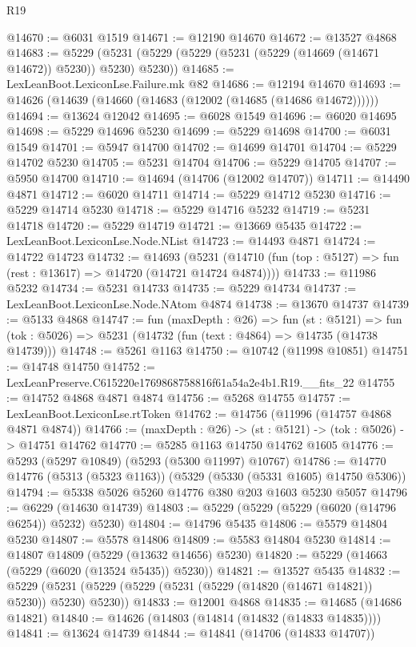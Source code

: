 \begin{lexlean}{R19}
\begin{coremodule}
@14670 := @6031 @1519
@14671 := @12190 @14670
@14672 := @13527 @4868
@14683 := @5229 (@5231 (@5229 (@5229 (@5231 (@5229 (@14669 (@14671 @14672)) @5230)) @5230) @5230))
@14685 := LexLeanBoot.LexiconLse.Failure.mk @82
@14686 := @12194 @14670
@14693 := @14626 (@14639 (@14660 (@14683 (@12002 (@14685 (@14686 @14672))))))
@14694 := @13624 @12042
@14695 := @6028 @1549
@14696 := @6020 @14695
@14698 := @5229 @14696 @5230
@14699 := @5229 @14698
@14700 := @6031 @1549
@14701 := @5947 @14700
@14702 := @14699 @14701
@14704 := @5229 @14702 @5230
@14705 := @5231 @14704
@14706 := @5229 @14705
@14707 := @5950 @14700
@14710 := @14694 (@14706 (@12002 @14707))
@14711 := @14490 @4871
@14712 := @6020 @14711
@14714 := @5229 @14712 @5230
@14716 := @5229 @14714 @5230
@14718 := @5229 @14716 @5232
@14719 := @5231 @14718
@14720 := @5229 @14719
@14721 := @13669 @5435
@14722 := LexLeanBoot.LexiconLse.Node.NList
@14723 := @14493 @4871
@14724 := @14722 @14723
@14732 := @14693
    (@5231 (@14710 (fun (top : @5127) => fun (rest : @13617) => @14720 (@14721 @14724 @4874))))
@14733 := @11986 @5232
@14734 := @5231 @14733
@14735 := @5229 @14734
@14737 := LexLeanBoot.LexiconLse.Node.NAtom @4874
@14738 := @13670 @14737
@14739 := @5133 @4868
@14747 := fun (maxDepth : @26) =>
  fun (st : @5121) =>
  fun (tok : @5026) => @5231 (@14732 (fun (text : @4864) => @14735 (@14738 @14739)))
@14748 := @5261 @1163
@14750 := @10742 (@11998 @10851)
@14751 := @14748 @14750
@14752 := LexLeanPreserve.C615220e1769868758816f61a54a2e4b1.R19.__fits_22
@14755 := @14752 @4868 @4871 @4874
@14756 := @5268 @14755
@14757 := LexLeanBoot.LexiconLse.rtToken
@14762 := @14756 (@11996 (@14757 @4868 @4871 @4874))
@14766 := (maxDepth : @26) -> (st : @5121) -> (tok : @5026) -> @14751 @14762
@14770 := @5285 @1163 @14750 @14762 @1605
@14776 := @5293 (@5297 @10849) (@5293 (@5300 @11997) @10767)
@14786 := @14770 @14776 (@5313 (@5323 @1163)) (@5329 (@5330 (@5331 @1605) @14750 @5306))
@14794 := @5338 @5026 @5260 @14776 @380 @203 @1603 @5230 @5057
@14796 := @6229 (@14630 @14739)
@14803 := @5229 (@5229 (@5229 (@6020 (@14796 @6254)) @5232) @5230)
@14804 := @14796 @5435
@14806 := @5579 @14804 @5230
@14807 := @5578 @14806
@14809 := @5583 @14804 @5230
@14814 := @14807 @14809 (@5229 (@13632 @14656) @5230)
@14820 := @5229 (@14663 (@5229 (@6020 (@13524 @5435)) @5230))
@14821 := @13527 @5435
@14832 := @5229 (@5231 (@5229 (@5229 (@5231 (@5229 (@14820 (@14671 @14821)) @5230)) @5230) @5230))
@14833 := @12001 @4868
@14835 := @14685 (@14686 @14821)
@14840 := @14626 (@14803 (@14814 (@14832 (@14833 @14835))))
@14841 := @13624 @14739
@14844 := @14841 (@14706 (@14833 @14707))

\end{coremodule}
\end{lexlean}

